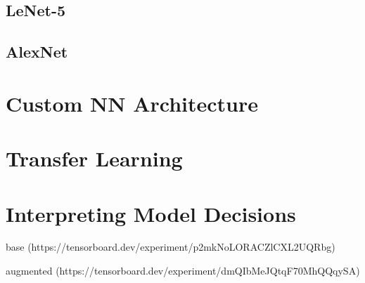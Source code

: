 \subsection{LeNet-5}
\subsection{AlexNet}

\section{Custom NN Architecture}

\section{Transfer Learning}

\section{Interpreting Model Decisions}

base (https://tensorboard.dev/experiment/p2mkNoLORACZlCXL2UQRbg)


augmented (https://tensorboard.dev/experiment/dmQIbMeJQtqF70MhQQqySA)